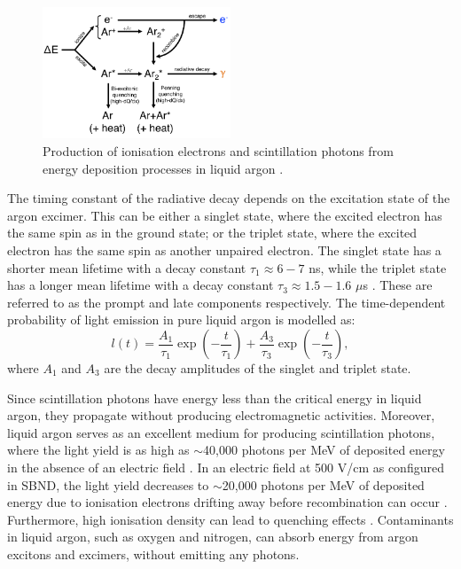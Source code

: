 \begin{figure}[ht!] 
\centering    
\includegraphics[width=0.5\textwidth]{recomb_diagram}
\caption[Energy Deposition in Liquid Argon Diagram]{
Production of ionisation electrons and scintillation photons from energy deposition processes in liquid argon \cite{Lariat}.
}
\label{fig:recomb_diagram}
\end{figure}

The timing constant of the radiative decay depends on the excitation state of the argon excimer.
This can be either a singlet state, where the excited electron has the same spin as in the ground state; or the triplet state, where the excited electron has the same spin as another unpaired electron.
The singlet state has a shorter mean lifetime with a decay constant $\tau_{1} \approx 6 - 7$ ns, while the triplet state has a longer mean lifetime with a decay constant $\tau_{3} \approx 1.5 - 1.6$ 
$\mu$s \cite{photon_lifetime}.
These are referred to as the prompt and late components respectively. 
The time-dependent probability of light emission in pure liquid argon is modelled as:
\begin{equation}
        l(t)=\frac{A_{1}}{\tau_{1}}\exp{\left(-\frac{t}{\tau_{1}}\right)} +\frac{A_{3}}{\tau_{3}}\exp{\left(-\frac{t}{\tau_{3}}\right)},
\end{equation}
where $A_{1}$ and $A_{3}$ are the decay amplitudes of the singlet and triplet state.

Since scintillation photons have energy less than the critical energy in liquid argon, they propagate without producing electromagnetic activities. 
Moreover, liquid argon serves as an excellent medium for producing scintillation photons, where the light yield is as high as $\sim$40,000 photons per MeV of deposited energy in the absence of an electric field \cite{light_yield}.
In an electric field at 500 V/cm as configured in SBND, the light yield decreases to $\sim$20,000 photons per MeV of deposited energy due to ionisation electrons drifting away before recombination can occur \cite{light_yield_Efield}.
Furthermore, high ionisation density can lead to quenching effects \cite{Lariat}.
Contaminants in liquid argon, such as oxygen and nitrogen, can absorb energy from argon excitons and excimers, without emitting any photons.
 
